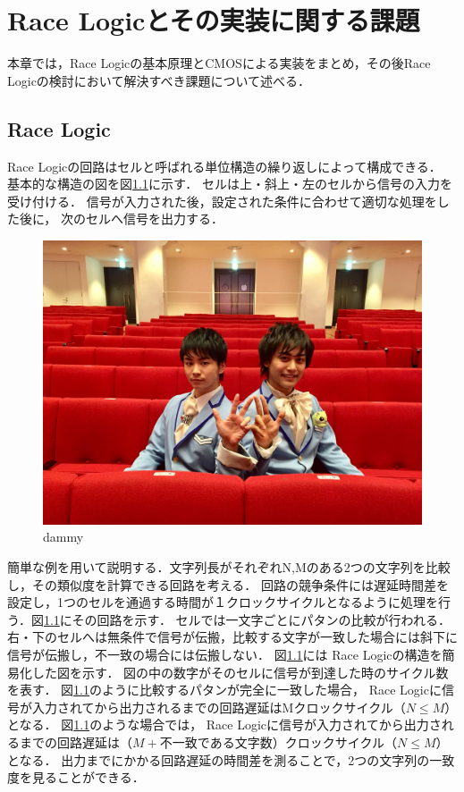 \chapter{Race Logicとその実装に関する課題}
本章では，Race Logicの基本原理とCMOSによる実装をまとめ，その後Race Logicの検討において解決すべき課題について述べる．
\section{Race Logic}
Race Logicの回路はセルと呼ばれる単位構造の繰り返しによって構成できる．
基本的な構造の図を図\ref{dammy}に示す．
セルは上・斜上・左のセルから信号の入力を受け付ける．
信号が入力された後，設定された条件に合わせて適切な処理をした後に，
次のセルへ信号を出力する．
\begin{figure}[t!]
\begin{center}
\includegraphics[keepaspectratio,scale=0.01]{fig/dammy.jpg}
\caption{dammy}
\label{dammy}
\end{center}
\end{figure}

簡単な例を用いて説明する．文字列長がそれぞれN,Mのある2つの文字列を比較し，その類似度を計算できる回路を考える．
回路の競争条件には遅延時間差を設定し，1つのセルを通過する時間が１クロックサイクルとなるように処理を行う．図\ref{dammy}にその回路を示す．
セルでは一文字ごとにパタンの比較が行われる．
右・下のセルへは無条件で信号が伝搬，比較する文字が一致した場合には斜下に信号が伝搬し，不一致の場合には伝搬しない．
図\ref{dammy}には Race Logicの構造を簡易化した図を示す．
図の中の数字がそのセルに信号が到達した時のサイクル数を表す．
図\ref{dammy}のように比較するパタンが完全に一致した場合，
Race Logicに信号が入力されてから出力されるまでの回路遅延はMクロックサイクル（$N \leq M$）となる．
図\ref{dammy}のような場合では，
Race Logicに信号が入力されてから出力されるまでの回路遅延は（$M+不一致である文字数$）クロックサイクル（$N \leq M$）となる．
出力までにかかる回路遅延の時間差を測ることで，2つの文字列の一致度を見ることができる．

